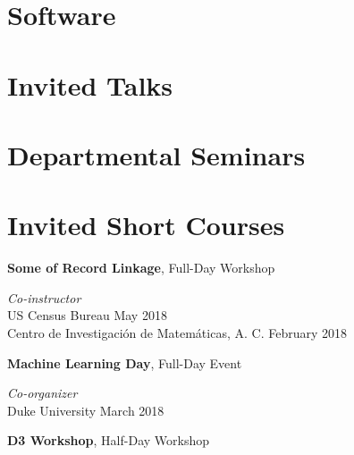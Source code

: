 \documentclass[margin,line]{res}
\begin{document}
\begin{resume}
\section{\sc Software}
\printbibliography[keyword=packages, heading=none, resetnumbers=true]

\section{\sc Invited Talks}
\printbibliography[keyword=talk-invited, heading=none, resetnumbers=true]

\section{\sc Departmental Seminars}
\printbibliography[keyword=seminar, heading=none, resetnumbers=true]

\section{\sc Invited Short Courses}

{\bf Some of Record Linkage},  Full-Day Workshop

\vspace{-.4cm}
{\em Co-instructor} \hfill \\

\vspace{-.7cm}
US Census Bureau \hfill May 2018 \\

\vspace{-.7cm}
Centro de Investigaci\'{o}n de Matem\'{a}ticas, A. C. \hfill February 2018



{\bf Machine Learning Day}, Full-Day Event

\vspace{-.4cm}
{\em Co-organizer} \hfill \\

\vspace{-.7cm}
Duke University \hfill March 2018


{\bf D3 Workshop}, Half-Day Workshop


\end{resume}
\end{document}
